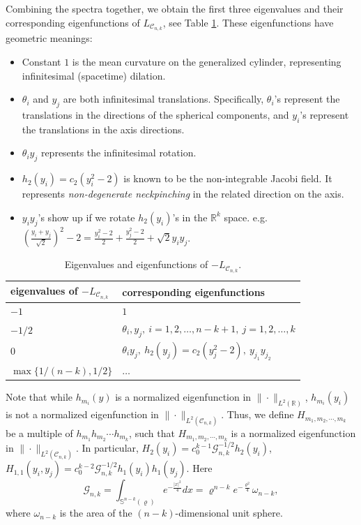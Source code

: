 \documentclass[11pt]{amsart}
\numberwithin{equation}{section}
\numberwithin{equation}{section}
\newcommand{\cC}{\mathcal{C}}
\newcommand{\cG}{\mathcal{G}}
\newcommand{\R}{\mathbb{R}}
\begin{document}
	
	Combining the spectra together, we obtain the first three eigenvalues and their corresponding eigenfunctions of $L_{\cC_{n,k}}$, see Table \ref{TableEigen}. These eigenfunctions have geometric meanings: 
	\begin{itemize}
		\item Constant $1$ is the mean curvature on the generalized cylinder, representing infinitesimal (spacetime) dilation.
		\item $\theta_i$ and $y_j$ are both infinitesimal translations. Specifically, $\theta_i$'s represent the translations in the directions of the spherical components, and $y_i$'s represent the translations in the axis directions.
		\item $\theta_i y_j$ represents the infinitesimal rotation.
		\item $h_2(y_i)=c_2(y_i^2-2)$ is known to be the non-integrable Jacobi field. It represents \emph{non-degenerate neckpinching} in the related direction on the axis. 
		\item $y_iy_j$'s show up if we rotate $h_2(y_i)$'s in the $\R^k$ space. e.g. $\left(\frac{y_i+y_j}{\sqrt2}\right)^2-2=\frac{y_i^2-2}{2}+\frac{y_j^2-2}{2}+\sqrt{2}y_iy_j$.
	\end{itemize}
	
	\begin{table}[H]
		\begin{tabular}{|l|l|}
			\hline
			eigenvalues of $-L_{\cC_{n,k}}$ & corresponding eigenfunctions \\ \hline
			$-1$ & $1$ \\ \hline
			$-1/2$ & $\theta_i,y_j,\ i=1,2,\ldots,n-k+1,\ j=1,2,\ldots,k$ \\ \hline
			$0$ & $\theta_iy_j,\ h_2(y_j)=c_2(y_j^2-2),\ y_{j_1}y_{j_2}$ \\ \hline
			$\max\{1/(n-k),1/2\}$ & $\ldots$ 
			\\ \hline
		\end{tabular}
		\caption{Eigenvalues and eigenfunctions of $-L_{\cC_{n,k}}$.}
		\label{TableEigen}
	\end{table}
	
	Note that while $h_{m_i}(y)$ is a normalized eigenfunction in $\|\cdot\|_{L^2(\R)}$, $h_{m_i}(y_i)$ is not a normalized eigenfunction in $\|\cdot\|_{L^2(\cC_{n,k})}$. Thus, we define $H_{m_1,m_2,\cdots,m_k}$ be a multiple of $h_{m_1}h_{m_2}\cdots h_{m_k}$, such that $H_{m_1,m_2,\cdots,m_k}$ is a normalized eigenfunction in $\|\cdot\|_{L^2(\cC_{n,k})}$. In particular, $H_2(y_i)=c_0^{k-1}\cG_{n,k}^{-1/2}h_2(y_i)$, $H_{1,1}(y_i,y_j)=c_0^{k-2}\cG_{n,k}^{-1/2}h_1(y_i)h_1(y_j)$. Here \begin{equation}\label{EqcG}
		\cG_{n,k}=\int_{\mathbb S^{n-k}(\varrho)}e^{-\frac{|x|^2}{4}}dx=\varrho^{n-k}e^{-\frac{\varrho^2}{4}}\omega_{n-k},        
	\end{equation}
	where $\omega_{n-k}$ is the area of the $(n-k)$-dimensional unit sphere.
	
\end{document}
